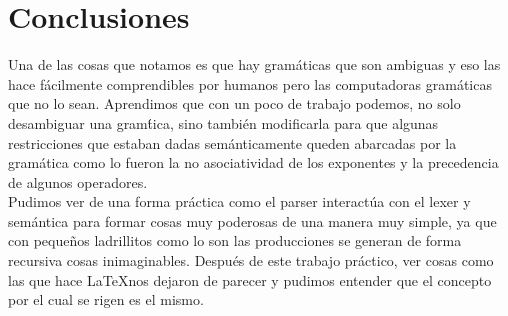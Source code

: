 \section{Conclusiones}
Una de las cosas que notamos es que hay gram\'aticas que son ambiguas y eso las hace f\'acilmente comprendibles
por humanos pero las computadoras  gram\'aticas que no lo sean. Aprendimos que con un poco de trabajo
podemos, no solo desambiguar una gram\'tica, sino tambi\'en modificarla para que algunas restricciones que estaban dadas sem\'anticamente
queden abarcadas por la gram\'atica como lo fueron la no asociatividad de los exponentes y la precedencia de algunos operadores. \\

Pudimos ver de una forma pr\'actica como el parser interact\'ua con el lexer y sem\'antica para formar cosas muy poderosas de una
manera muy simple, ya que con peque\~nos ladrillitos como lo son las producciones se generan de forma recursiva cosas inimaginables.
Despu\'es de este trabajo pr\'actico, ver cosas como las que hace \LaTeX \hspace{0.1cm}nos dejaron de parecer  y pudimos entender
que el concepto por el cual se rigen es el mismo. \\